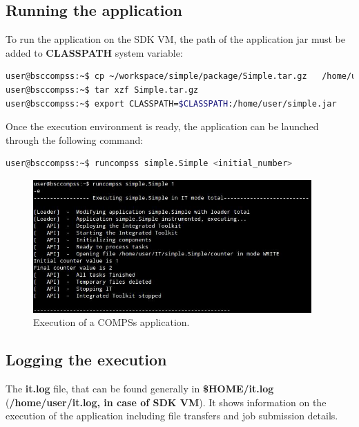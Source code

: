 \subsection{Running the application}
\label{subsec:running_apps}

To run the application on the SDK VM, the path of the application jar must be added to {\bf CLASSPATH} system variable:

\begin{lstlisting}[language=bash]
user@bsccompss:~$ cp ~/workspace/simple/package/Simple.tar.gz   /home/user/
user@bsccompss:~$ tar xzf Simple.tar.gz
user@bsccompss:~$ export CLASSPATH=$CLASSPATH:/home/user/simple.jar
\end{lstlisting}

Once the execution environment is ready, the application can be launched through the following command:

\begin{lstlisting}[language=bash]
user@bsccompss:~$ runcompss simple.Simple <initial_number>
\end{lstlisting}

\begin{figure}[h!]
  \centering
    \includegraphics[width=0.95\textwidth]{./Sections/3_Running_Apps/Figures/compss_execution.jpeg}
    \caption{Execution of a COMPSs application. \label{fig:compss_execution}}
\end{figure}
\vspace{-0.4cm}


\subsection{Logging the execution}
The {\bf it.log} file, that can be found generally in {\bf \$HOME/it.log} ({\bf /home/user/it.log, in case of SDK VM}). 
It shows information on the execution of the application including file transfers and job submission details.

